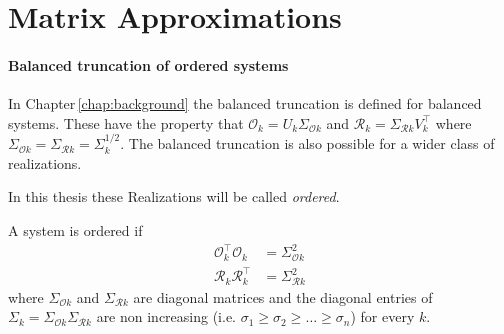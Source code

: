 \documentclass[doctype=mastersthesis,BCOR=15mm,biblatex]{ldvbook}%
\DeclareMathOperator{\diag}{diag}
\newcommand{\R}{\mathcal{R}} %
\newcommand{\Ob}{\mathcal{O}} %
\begin{document}
\section{Matrix Approximations}\label{sec:approx}



\paragraph{Balanced truncation of ordered systems}
In Chapter\,\ref{chap:background} the balanced truncation is defined for balanced systems.
These have the property that $\Ob_k = U_k \Sigma_{\Ob k}$ and $\R_k = \Sigma_{\R k} V_k^\top$ where $\Sigma_{\Ob k} = \Sigma_{\R k}=\Sigma_k^{1/2}$.
The balanced truncation is also possible for a wider class of realizations.

In this thesis these Realizations will be called  \emph{ordered}.
\begin{definition}
	A system is ordered if 
	\begin{subequations}
	\begin{align}
		\Ob_k^\top \Ob_k &= \Sigma_ {\Ob k}^2 \label{eq:orderd_obs}\\ %
		\R_k \R_k^\top &= \Sigma_ {\R k}^2 \label{eq:orderd_reach}%
	\end{align}
	\end{subequations}
	where $\Sigma_{\Ob k}$ and $\Sigma_{\R k}$ are diagonal matrices
	and the diagonal entries of $\Sigma_k =\Sigma_{\Ob k}\Sigma_{\R k}$ are non increasing (i.e. $\sigma_1 \geq \sigma_2 \geq \dots \geq \sigma_n$)
    for every $k$.
\end{definition}
\end{document}
